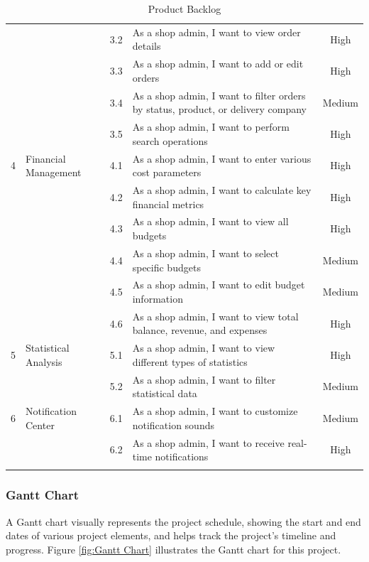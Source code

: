 \begin{longtable}{|c|p{6cm}|c|p{6cm}|c|}
& & 3.2 & As a shop admin, I want to view order details & High \\ \cline{3-5}
& & 3.3 & As a shop admin, I want to add or edit orders & High \\ \cline{3-5}
& & 3.4 & As a shop admin, I want to filter orders by status, product, or delivery company & Medium \\ \cline{3-5}
& & 3.5 & As a shop admin, I want to perform search operations & High \\ \hline
\multirow{1}{*}{4} & \multirow{1}{*}{Financial Management} & 4.1 & As a shop admin, I want to enter various cost parameters & High \\ \cline{3-5}
& & 4.2 & As a shop admin, I want to calculate key financial metrics & High \\ \cline{3-5}
& & 4.3 & As a shop admin, I want to view all budgets & High \\ \cline{3-5}
& & 4.4 & As a shop admin, I want to select specific budgets & Medium \\ \cline{3-5}
& & 4.5 & As a shop admin, I want to edit budget information & Medium \\ \cline{3-5}
& & 4.6 & As a shop admin, I want to view total balance, revenue, and expenses & High \\ \hline
\multirow{1}{*}{5} & \multirow{1}{*}{Statistical Analysis} & 5.1 & As a shop admin, I want to view different types of statistics & High \\ \cline{3-5}
& & 5.2 & As a shop admin, I want to filter statistical data & Medium \\ \hline
\multirow{1}{*}{6} & \multirow{1}{*}{Notification Center} & 6.1 & As a shop admin, I want to customize notification sounds & Medium \\ \cline{3-5}
& & 6.2 & As a shop admin, I want to receive real-time notifications & High \\ \hline

\caption{Product Backlog}
\label{tab:product_backlog}
\end{longtable}

\subsubsection{Gantt Chart}
A Gantt chart visually represents the project schedule, showing the start and end dates of various project elements, and helps track the project's timeline and progress. Figure \ref{fig:Gantt Chart} illustrates the Gantt chart for this project.

